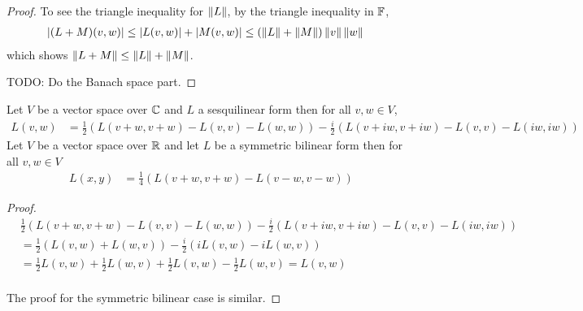 \begin{proof}
To see the triangle inequality for $\left \lVert L \right \rVert$,  by the triangle inequality in $\mathbb{F}$,
\begin{align*}
\left \vert (L+M)(v,w) \right \vert &\leq \left \vert L(v,w) \right \vert + \left \vert M(v,w) \right \vert \leq (\left \lVert L \right \rVert+\left \lVert M \right \rVert) \left \lVert v \right \rVert \left \lVert w \right \rVert
\end{align*}
which shows $\left \lVert L+M \right \rVert \leq \left \lVert L \right \rVert+\left \lVert M \right \rVert$.

TODO: Do the Banach space part.
\end{proof}

\begin{prop}\label{hilbert:PolarizationIdentity}Let $V$ be a vector space over $\mathbb{C}$ and $L$ a sesquilinear form then for all $v,w \in V$,
\begin{align*}
L(v,w) &= \frac{1}{2} \left ( L(v+w, v+w) - L(v,v) - L(w,w) \right) - \frac{i}{2} \left ( L(v+iw, v+iw) - L(v,v) - L(iw,iw) \right) 
\end{align*}
Let $V$ be a vector space over $\mathbb{R}$ and let $L$ be a symmetric bilinear form then for all $v,w \in V$
\begin{align*}
L(x,y) &= \frac{1}{4} \left( L(v+w, v+w) - L(v-w, v-w) \right)
\end{align*}
\end{prop}
\begin{proof}
\begin{align*}
&\frac{1}{2} \left ( L(v+w, v+w) - L(v,v) - L(w,w) \right) - \frac{i}{2} \left ( L(v+iw, v+iw) - L(v,v) - L(iw,iw) \right) \\
&=\frac{1}{2} \left ( L(v,w) + L(w,v) \right) - \frac{i}{2} \left ( i L(v, w) - i L(w,v) \right) \\
&=\frac{1}{2}  L(v,w) + \frac{1}{2}  L(w,v)  + \frac{1}{2}  L(v, w) - \frac{1}{2}  L(w,v) = L(v,w) \\
\end{align*}

The proof for the symmetric bilinear case is similar.
\end{proof}

